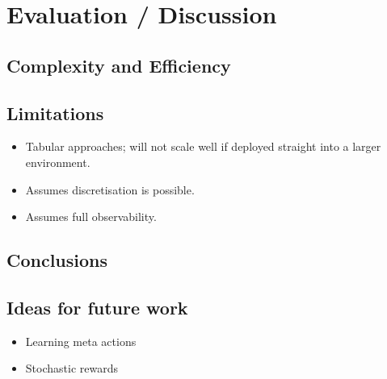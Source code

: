 \chapter{Evaluation / Discussion}
\label{chapter6}
\section{Complexity and Efficiency}
\section{Limitations}
\begin{itemize}
    \item Tabular approaches; will not scale well if deployed straight into a larger environment.
    \item Assumes discretisation is possible.
    \item Assumes full observability.
    
\end{itemize}
\section{Conclusions}

\section{Ideas for future work}
\begin{itemize}
    \item Learning meta actions
    \item Stochastic rewards
\end{itemize}

